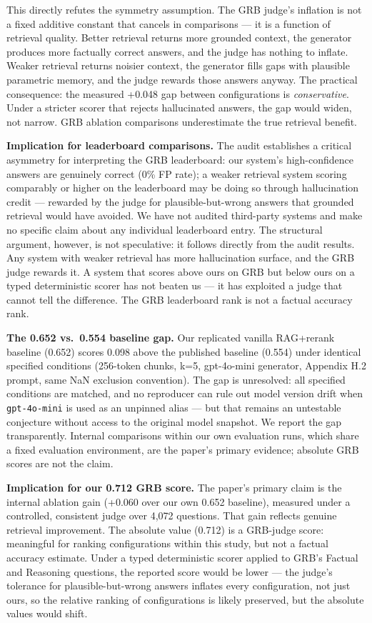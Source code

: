 This directly refutes the symmetry assumption. The GRB judge's inflation is not a fixed additive constant that cancels in comparisons --- it is a function of retrieval quality. Better retrieval returns more grounded context, the generator produces more factually correct answers, and the judge has nothing to inflate. Weaker retrieval returns noisier context, the generator fills gaps with plausible parametric memory, and the judge rewards those answers anyway. The practical consequence: the measured +0.048 gap between configurations is \emph{conservative}. Under a stricter scorer that rejects hallucinated answers, the gap would widen, not narrow. GRB ablation comparisons underestimate the true retrieval benefit.

\textbf{Implication for leaderboard comparisons.} The audit establishes a critical asymmetry for interpreting the GRB leaderboard: our system's high-confidence answers are genuinely correct (0\% FP rate); a weaker retrieval system scoring comparably or higher on the leaderboard may be doing so through hallucination credit --- rewarded by the judge for plausible-but-wrong answers that grounded retrieval would have avoided. We have not audited third-party systems and make no specific claim about any individual leaderboard entry. The structural argument, however, is not speculative: it follows directly from the audit results. Any system with weaker retrieval has more hallucination surface, and the GRB judge rewards it. A system that scores above ours on GRB but below ours on a typed deterministic scorer has not beaten us --- it has exploited a judge that cannot tell the difference. The GRB leaderboard rank is not a factual accuracy rank.

\textbf{The 0.652 vs.~0.554 baseline gap.} Our replicated vanilla RAG+rerank baseline (0.652) scores 0.098 above the published baseline (0.554) under identical specified conditions (256-token chunks, k=5, gpt-4o-mini generator, Appendix H.2 prompt, same NaN exclusion convention). The gap is unresolved: all specified conditions are matched, and no reproducer can rule out model version drift when \texttt{gpt-4o-mini} is used as an unpinned alias --- but that remains an untestable conjecture without access to the original model snapshot. We report the gap transparently. Internal comparisons within our own evaluation runs, which share a fixed evaluation environment, are the paper's primary evidence; absolute GRB scores are not the claim.

\textbf{Implication for our 0.712 GRB score.} The paper's primary claim is the internal ablation gain (+0.060 over our own 0.652 baseline), measured under a controlled, consistent judge over 4,072 questions. That gain reflects genuine retrieval improvement. The absolute value (0.712) is a GRB-judge score: meaningful for ranking configurations within this study, but not a factual accuracy estimate. Under a typed deterministic scorer applied to GRB's Factual and Reasoning questions, the reported score would be lower --- the judge's tolerance for plausible-but-wrong answers inflates every configuration, not just ours, so the relative ranking of configurations is likely preserved, but the absolute values would shift.

